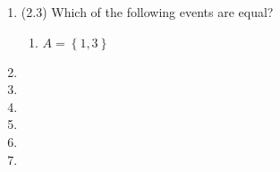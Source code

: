\documentclass[basic, header]{nosvagor-notes}
\begin{document}
\begin{enumerate}
  \item (2.3) Which of the following events are equal?
    \begin{enumerate}
      \item \(A = \left\{ 1,3 \right\} \)

    \end{enumerate}

  \item

  \item

  \item

  \item

  \item

  \item

\end{enumerate}
\end{document}
